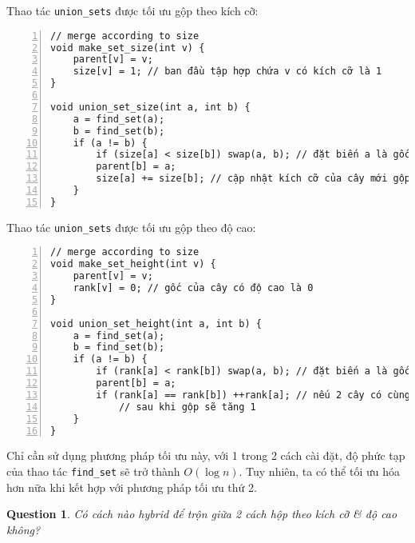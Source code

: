 \documentclass{article}
\newtheorem{question}{Question}
\begin{document}
Thao tác \verb|union_sets| được tối ưu gộp theo kích cỡ:
\begin{Verbatim}[numbers=left,xleftmargin=5mm]
// merge according to size
void make_set_size(int v) {
    parent[v] = v;
    size[v] = 1; // ban đầu tập hợp chứa v có kích cỡ là 1
}

void union_set_size(int a, int b) {
    a = find_set(a);
    b = find_set(b);
    if (a != b) {
        if (size[a] < size[b]) swap(a, b); // đặt biến a là gốc của cây có kích cỡ lớn hơn
        parent[b] = a;
        size[a] += size[b]; // cập nhật kích cỡ của cây mới gộp lại
    }
}
\end{Verbatim}
Thao tác \verb|union_sets| được tối ưu gộp theo độ cao:
\begin{Verbatim}[numbers=left,xleftmargin=5mm]
// merge according to size
void make_set_height(int v) {
    parent[v] = v;
    rank[v] = 0; // gốc của cây có độ cao là 0
}

void union_set_height(int a, int b) {
    a = find_set(a);
    b = find_set(b);
    if (a != b) {
        if (rank[a] < rank[b]) swap(a, b); // đặt biến a là gốc của cây có độ cao lớn hơn
        parent[b] = a;
        if (rank[a] == rank[b]) ++rank[a]; // nếu 2 cây có cùng 1 độ cao, độ cao của cây mới
            // sau khi gộp sẽ tăng 1
    }
}
\end{Verbatim}
Chỉ cần sử dụng phương pháp tối ưu này, với 1 trong 2 cách cài đặt, độ phức tạp của thao tác \verb|find_set| sẽ trở thành $O(\log n)$. Tuy nhiên, ta có thể tối ưu hóa hơn nữa khi kết hợp với phương pháp tối ưu thứ 2.

\begin{question}
    Có cách nào hybrid để trộn giữa 2 cách hộp theo kích cỡ \& độ cao không?
\end{question}

\end{document}
